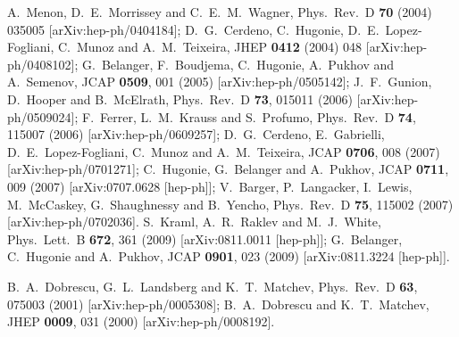\documentclass[aps,prl,twocolumn,nofootinbib,superscriptaddress]{revtex4}
\begin{document}
\begin{thebibliography}{99}
A.~Menon, D.~E.~Morrissey and C.~E.~M.~Wagner,
  Phys.\ Rev.\  D {\bf 70} (2004) 035005
  [arXiv:hep-ph/0404184];
  D.~G.~Cerdeno, C.~Hugonie, D.~E.~Lopez-Fogliani, C.~Munoz and A.~M.~Teixeira,
  JHEP {\bf 0412} (2004) 048
  [arXiv:hep-ph/0408102];
  G.~Belanger, F.~Boudjema, C.~Hugonie, A.~Pukhov and A.~Semenov,
  JCAP {\bf 0509}, 001 (2005)
  [arXiv:hep-ph/0505142];
  J.~F.~Gunion, D.~Hooper and B.~McElrath,
  Phys.\ Rev.\  D {\bf 73}, 015011 (2006)
  [arXiv:hep-ph/0509024];
  F.~Ferrer, L.~M.~Krauss and S.~Profumo,
  Phys.\ Rev.\  D {\bf 74}, 115007 (2006)
  [arXiv:hep-ph/0609257];
   D.~G.~Cerdeno, E.~Gabrielli, D.~E.~Lopez-Fogliani, C.~Munoz and A.~M.~Teixeira,
  JCAP {\bf 0706}, 008 (2007)
  [arXiv:hep-ph/0701271];
  C.~Hugonie, G.~Belanger and A.~Pukhov,
  JCAP {\bf 0711}, 009 (2007)
  [arXiv:0707.0628 [hep-ph]];
  V.~Barger, P.~Langacker, I.~Lewis, M.~McCaskey, G.~Shaughnessy and B.~Yencho,
  Phys.\ Rev.\  D {\bf 75}, 115002 (2007)
  [arXiv:hep-ph/0702036].
  S.~Kraml, A.~R.~Raklev and M.~J.~White,
  Phys.\ Lett.\  B {\bf 672}, 361 (2009)
  [arXiv:0811.0011 [hep-ph]];
  G.~Belanger, C.~Hugonie and A.~Pukhov,
  JCAP {\bf 0901}, 023 (2009)
  [arXiv:0811.3224 [hep-ph]].
  








B.~A.~Dobrescu, G.~L.~Landsberg and K.~T.~Matchev,
  Phys.\ Rev.\  D {\bf 63}, 075003 (2001)
  [arXiv:hep-ph/0005308];
%
 B.~A.~Dobrescu and K.~T.~Matchev,
  JHEP {\bf 0009}, 031 (2000)
  [arXiv:hep-ph/0008192].
  

\end{thebibliography}
\end{document}

